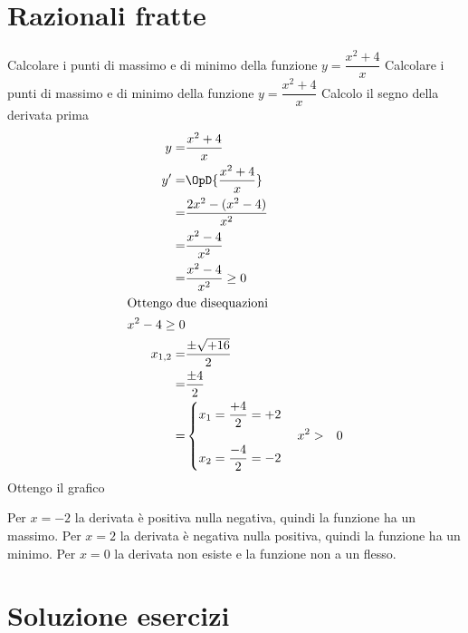 \section{Razionali fratte}
\tcbstartrecording
\begin{exercise}
Calcolare i punti di massimo e di minimo della funzione $y=\dfrac{x^2+4}{x}$
	\tcblower
Calcolare i punti di massimo e di minimo della funzione $y=\dfrac{x^2+4}{x}$
Calcolo il segno della derivata prima
\begin{align*}
y=&\dfrac{x^2+4}{x}\\
y'=&\OpD{\dfrac{x^2+4}{x}}\\
=&\frac{2x^2-(x^2-4)}{x^{2}}\\
=&\frac{x^{2} - 4}{x^{2}}\\
=&\frac{x^{2} - 4}{x^{2}}\geq 0\\
\intertext{Ottengo due disequazioni}
x^2-4\geq 0\\
x_{1,2}=&\dfrac{\pm\sqrt{+16}}{2}\\
=&\dfrac{\pm 4}{2}\\
=&\begin{cases}
x_1=\dfrac{+4}{2}=+2\\
\\
x_2=\dfrac{-4}{2}=-2\\
\end{cases}
x^2>&0
\end{align*}
Ottengo il grafico
\begin{center}
	
\end{center}
Per $x=-2$ la derivata è positiva nulla negativa, quindi la funzione ha un massimo. Per $x=2$ la derivata è negativa nulla positiva, quindi la funzione ha un minimo. Per $x=0$ la derivata non esiste e la funzione non a un flesso. 
\end{exercise}
\tcbstoprecording
\newpage
\section{Soluzione esercizi}
\tcbinputrecords
\newpage